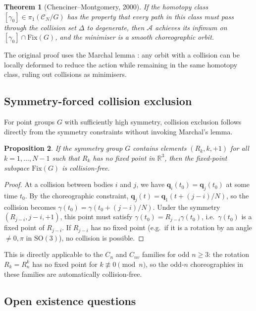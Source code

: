 \documentclass[12pt, a4paper]{article}
\theoremstyle{plain}
\newtheorem{theorem}{Theorem}[section]
\newtheorem{proposition}[theorem]{Proposition}
\theoremstyle{definition}
\newcommand{\R}{\mathbb{R}}
\newcommand{\Action}{\mathcal{A}}
\newcommand{\Fix}{\mathrm{Fix}}
\newcommand{\bfq}{\mathbf{q}}
\newcommand{\SO}{\mathrm{SO}}
\begin{document}
\begin{theorem}[Chenciner--Montgomery, 2000]\label{thm:cm}
If the homotopy class $[\gamma_0] \in \pi_1(\mathcal{C}_N / G)$
has the property that every path in this class must pass through the
collision set $\Delta$ to degenerate, then $\Action$ achieves its
infimum on $[\gamma_0] \cap \Fix(G)$, and the minimiser is a smooth
choreographic orbit.
\end{theorem}

The original proof uses the Marchal lemma \cite{Marchal2002}: any
orbit with a collision can be locally deformed to reduce the action
while remaining in the same homotopy class, ruling out collisions as
minimisers.

\subsection{Symmetry-forced collision exclusion}

For point groups $G$ with sufficiently high symmetry, collision
exclusion follows directly from the symmetry constraints without
invoking Marchal's lemma.

\begin{proposition}\label{prop:collision-free}
If the symmetry group $G$ contains elements $(R_k, k, +1)$ for all
$k = 1, \ldots, N-1$ such that $R_k$ has no fixed point in $\R^3$,
then the fixed-point subspace $\Fix(G)$ is collision-free.
\end{proposition}

\begin{proof}
At a collision between bodies $i$ and $j$, we have
$\bfq_i(t_0) = \bfq_j(t_0)$ at some time $t_0$.  By the
choreographic constraint, $\bfq_j(t) = \bfq_1(t + (j-i)/N)$, so
the collision becomes $\gamma(t_0) = \gamma(t_0 + (j-i)/N)$.  Under
the symmetry $(R_{j-i}, j-i, +1)$, this point must satisfy
$\gamma(t_0) = R_{j-i}\gamma(t_0)$, i.e.\ $\gamma(t_0)$ is a
fixed point of $R_{j-i}$.  If $R_{j-i}$ has no fixed point (e.g.\
if it is a rotation by an angle $\neq 0, \pi$ in $\SO(3)$),
no collision is possible.
\end{proof}

This is directly applicable to the $C_n$ and $C_{nv}$ families for
odd $n \geq 3$: the rotation $R_k = R_n^k$ has no fixed point for
$k \not\equiv 0 \pmod{n}$, so the odd-$n$ choreographies in these
families are automatically collision-free.

\subsection{Open existence questions}
\end{document}
